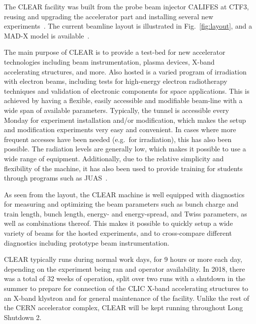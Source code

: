 \documentclass[a4paper,
               keeplastbox,   %
               ]{jacow}
\begin{document}
The CLEAR facility was built from the probe beam injector CALIFES at CTF3, reusing and upgrading the accelerator part and installing several new experiments~\cite{Gamba::CLEAR,Corsini:FirstCLEAR,CLEAR-WEB}.
The current beamline layout is illustrated in Fig.~\ref{fig:layout}, and a MAD-X model is available~\cite{CLEAR-MADX}.

The main purpose of CLEAR is to provide a test-bed for new accelerator technologies including beam instrumentation, plasma devices, X-band accelerating structures, and more.
Also hosted is a varied program of irradiation with electron beams, including tests for high-energy electron radiotherapy techniques and validation of electronic components for space applications.
This is achieved by having a flexible, easily accessible and modifiable beam-line with a wide span of available parameters.
Typically, the tunnel is accessible every Monday for experiment installation and/or modification, which makes the setup and modification experiments very easy and convenient.
In cases where more frequent accesses have been needed (e.g.\ for irradiation), this has also been possible.
The radiation levels are generally low, which makes it possible to use a wide range of equipment.
Additionally, due to the relative simplicity and flexibility of the machine, it has also been used to provide training for students through programs such as JUAS~\cite{JUAS19}.

As seen from the layout, the CLEAR machine is well equipped with diagnostics~\cite{HelenPHELMA} for measuring and optimizing the beam parameters such as bunch charge and train length, bunch length, energy- and energy-spread, and Twiss parameters, as well as combinations thereof.
This makes it possible to quickly setup a wide variety of beams for the hosted experiments, and to cross-compare different diagnostics including prototype beam instrumentation.

CLEAR typically runs during normal work days, for 9 hours or more each day, depending on the experiment being ran and operator availability.
In 2018, there was a total of 32 weeks of operation, split over two runs with a shutdown in the summer to prepare for connection of the CLIC X-band accelerating structures to an X-band klystron and for general maintenance of the facility.
Unlike the rest of the CERN accelerator complex, CLEAR will be kept running throughout Long Shutdown 2.
\end{document}
